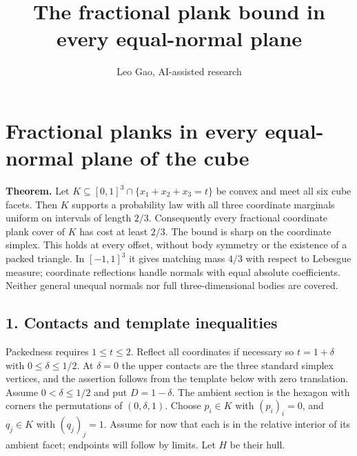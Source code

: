 \documentclass[
  10pt,
]{article}
\title{The fractional plank bound in every equal-normal plane}
\author{Leo Gao, AI-assisted research}
\date{}
\begin{document}
\maketitle

\section{Fractional planks in every equal-normal plane of the
cube}\label{fractional-planks-in-every-equal-normal-plane-of-the-cube}


\textbf{Theorem.} Let \(K\subseteq[0,1]^3\cap\{x_1+x_2+x_3=t\}\) be
convex and meet all six cube facets. Then \(K\) supports a probability
law with all three coordinate marginals uniform on intervals of length
\(2/3\). Consequently every fractional coordinate plank cover of \(K\)
has cost at least \(2/3\). The bound is sharp on the coordinate simplex.
This holds at every offset, without body symmetry or the existence of a
packed triangle. In \([-1,1]^3\) it gives matching mass \(4/3\) with
respect to Lebesgue measure; coordinate reflections handle normals with
equal absolute coefficients. Neither general unequal normals nor full
three-dimensional bodies are covered.

\subsection{1. Contacts and template
inequalities}\label{contacts-and-template-inequalities}

Packedness requires \(1\le t\le2\). Reflect all coordinates if necessary
so \(t=1+\delta\) with \(0\le\delta\le1/2\). At \(\delta=0\) the upper
contacts are the three standard simplex vertices, and the assertion
follows from the template below with zero translation. Assume
\(0<\delta\le1/2\) and put \(D=1-\delta\). The ambient section is the
hexagon with corners the permutations of \((0,\delta,1)\). Choose
\(p_i\in K\) with \((p_i)_i=0\), and \(q_j\in K\) with \((q_j)_j=1\).
Assume for now that each is in the relative interior of its ambient
facet; endpoints will follow by limits. Let \(H\) be their hull.
\end{document}
